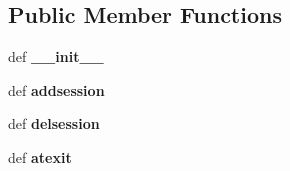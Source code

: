 \subsection*{Public Member Functions}
\begin{DoxyCompactItemize}
\item 
\hypertarget{classcore_1_1session_1_1_session_ae9d2deca1c6e67d87a7dd5754fe13538}{def {\bfseries \+\_\+\+\_\+init\+\_\+\+\_\+}}\label{classcore_1_1session_1_1_session_ae9d2deca1c6e67d87a7dd5754fe13538}

\item 
\hypertarget{classcore_1_1session_1_1_session_a0d21d49fa339f89c2bd9cd8a76867f49}{def {\bfseries addsession}}\label{classcore_1_1session_1_1_session_a0d21d49fa339f89c2bd9cd8a76867f49}

\item 
\hypertarget{classcore_1_1session_1_1_session_ae200845cd563987b896f8db26997898e}{def {\bfseries delsession}}\label{classcore_1_1session_1_1_session_ae200845cd563987b896f8db26997898e}

\item 
\hypertarget{classcore_1_1session_1_1_session_a99a032cd7f8c1e640c5e70776116cedb}{def {\bfseries atexit}}\label{classcore_1_1session_1_1_session_a99a032cd7f8c1e640c5e70776116cedb}


\end{DoxyCompactItemize}
